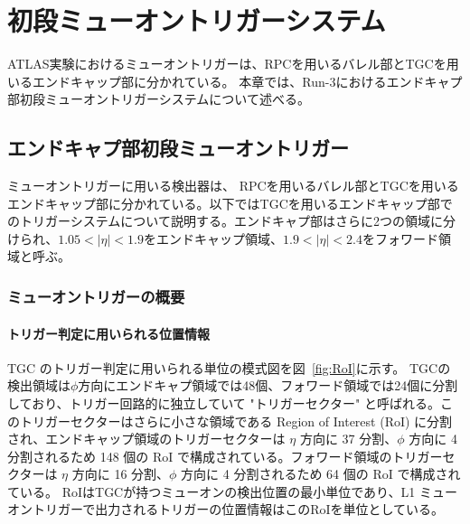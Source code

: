 \chapter{初段ミューオントリガーシステム}\label{chapter3}
ATLAS実験におけるミューオントリガーは、RPCを用いるバレル部とTGCを用いるエンドキャップ部に分かれている。
本章では、Run-3におけるエンドキャプ部初段ミューオントリガーシステムについて述べる。

\section{エンドキャプ部初段ミューオントリガー}
ミューオントリガーに用いる検出器は、
RPCを用いるバレル部とTGCを用いるエンドキャップ部に分かれている。以下ではTGCを用いるエンドキャップ部でのトリガーシステムについて説明する。エンドキャプ部はさらに2つの領域に分けられ、$1.05 < |\eta| < 1.9$をエンドキャップ領域、$1.9 < |\eta| < 2.4$をフォワード領域と呼ぶ。

\subsection{ミューオントリガーの概要}\label{section:CW}
\subsubsection{トリガー判定に用いられる位置情報}
TGC のトリガー判定に用いられる単位の模式図を図~\ref{fig:RoI}に示す。
TGCの検出領域は$\phi$方向にエンドキャプ領域では48個、フォワード領域では24個に分割しており、トリガー回路的に独立していて "トリガーセクター" と呼ばれる。このトリガーセクターはさらに小さな領域である Region of Interest (RoI) に分割され、エンドキャップ領域のトリガーセクターは $\eta$ 方向に 37 分割、$\phi$ 方向に 4 分割されるため 148 個の RoI で構成されている。フォワード領域のトリガーセクターは $\eta$ 方向に 16 分割、$\phi$ 方向に 4 分割されるため 64 個の RoI で構成されている。
RoIはTGCが持つミューオンの検出位置の最小単位であり、L1 ミューオントリガーで出力されるトリガーの位置情報はこのRoIを単位としている。

